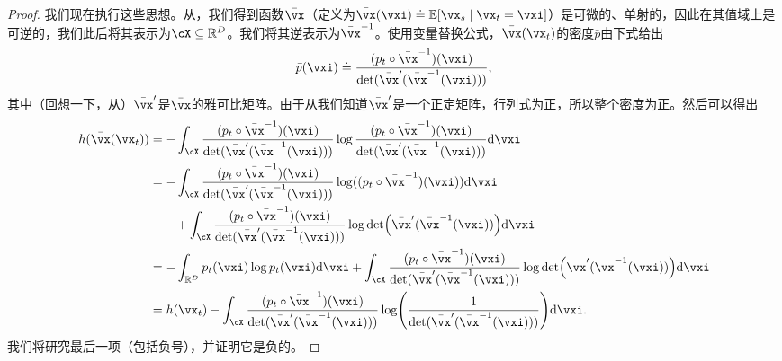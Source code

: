 \documentclass[../../book-main_zh.tex]{subfiles}
\begin{document}
\begin{proof}
    我们现在执行这些思想。从，我们得到函数\(\bar{\vx}\)（定义为\(\bar{\vx}(\vxi) \doteq \Ex[\vx_{s} \given \vx_{t} = \vxi]\)）是可微的、单射的，因此在其值域上是可逆的，我们此后将其表示为\(\cX \subseteq \R^{D}\)。我们将其逆表示为\(\bar{\vx}^{-1}\)。使用变量替换公式，\(\bar{\vx}(\vx_{t})\)的密度\(\bar{p}\)由下式给出
    \begin{equation}
        \bar{p}(\vxi) \doteq \frac{(p_{t} \circ \bar{\vx}^{-1})(\vxi)}{\det(\bar{\vx}^{\prime}(\bar{\vx}^{-1}(\vxi)))},
    \end{equation}
    其中（回想一下，从）\(\bar{\vx}^{\prime}\)是\(\bar{\vx}\)的雅可比矩阵。由于从我们知道\(\bar{\vx}^{\prime}\)是一个正定矩阵，行列式为正，所以整个密度为正。然后可以得出
    \begin{align}
        h(\bar{\vx}(\vx_{t}))
        &= -\int_{\cX}\frac{(p_{t} \circ \bar{\vx}^{-1})(\vxi)}{\det(\bar{\vx}^{\prime}(\bar{\vx}^{-1}(\vxi)))} \log \frac{(p_{t} \circ \bar{\vx}^{-1})(\vxi)}{\det(\bar{\vx}^{\prime}(\bar{\vx}^{-1}(\vxi)))} \odif{\vxi} \\ 
        &= -\int_{\cX}\frac{(p_{t} \circ \bar{\vx}^{-1})(\vxi)}{\det(\bar{\vx}^{\prime}(\bar{\vx}^{-1}(\vxi)))} \log((p_{t} \circ \bar{\vx}^{-1})(\vxi))\odif{\vxi} \\ 
        &\qquad + \int_{\cX}\frac{(p_{t} \circ
        \bar{\vx}^{-1})(\vxi)}{\det(\bar{\vx}^{\prime}(\bar{\vx}^{-1}(\vxi)))}\log\det\rp{\bar{\vx}^{\prime}(\bar{\vx}^{-1}(\vxi))}\odif{\vxi} \\ 
        &= -\int_{\R^{D}}p_{t}(\vxi)\log p_{t}(\vxi)\odif{\vxi}
        + \int_{\cX}\frac{(p_{t} \circ
        \bar{\vx}^{-1})(\vxi)}{\det(\bar{\vx}^{\prime}(\bar{\vx}^{-1}(\vxi)))}\log\det\rp{\bar{\vx}^{\prime}(\bar{\vx}^{-1}(\vxi))}\odif{\vxi} \\ 
        &= h(\vx_{t}) - \int_{\cX}\frac{(p_{t} \circ \bar{\vx}^{-1})(\vxi)}{\det(\bar{\vx}^{\prime}(\bar{\vx}^{-1}(\vxi)))}\log\rp{\frac{1}{\det(\bar{\vx}^{\prime}(\bar{\vx}^{-1}(\vxi)))}}\odif{\vxi}.
    \end{align}
    我们将研究最后一项（包括负号），并证明它是负的。


\end{proof}
\end{document}
